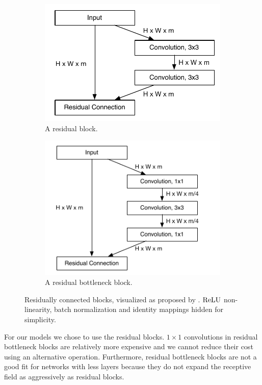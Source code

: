 \begin{figure}[h!]
  \begin{center}
  \begin{subfigure}{.5\textwidth}
    \begin{center}
        \includegraphics[width=.9\linewidth]{images/residual_block.pdf}
        \caption{A residual block.}
        \label{fig:residual_block}
      \end{center}
  \end{subfigure}%
    \begin{subfigure}{.5\textwidth}
      \begin{center}
        \includegraphics[width=.9\linewidth]{images/residual_bottleneck.pdf}
        \caption{A residual bottleneck block. }
        \label{fig:residual_bottleneck_block}
          \end{center}
  \end{subfigure}
  \end{center}
  \caption{Residually connected blocks, visualized as proposed by \cite{He:2015aa}. $\textrm{ReLU}$ non-linearity, batch normalization and identity mappings hidden for simplicity.}
  \label{fig:residual_blocks}
\end{figure}
For our models we chose to use the residual blocks. $1 \times 1$ convolutions in residual bottleneck blocks are relatively more expensive and we cannot reduce their cost using an alternative operation. Furthermore, residual bottleneck blocks are not a good fit for networks with less layers because they do not expand the receptive field as aggressively as residual blocks.

